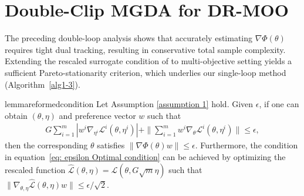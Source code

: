 \documentclass[twoside]{article} %
\def\eqref#1{equation~\ref{#1}}
\theoremstyle{plain}
\theoremstyle{definition}
\theoremstyle{remark}
\newcommand{\fL}{\mathcal{L}}
\newcommand{\fhL}{\hat{\mathcal{L}}}
\begin{document}
\section{Double-Clip MGDA for DR-MOO}\label{sec: single-loop algorithm}
The preceding double-loop analysis shows that accurately estimating \(\nabla\Phi(\theta)\) requires tight dual tracking, resulting in conservative total sample complexity. Extending the rescaled surrogate condition of \citet{jinnonconvexdro} to multi-objective setting yields a sufficient Pareto-stationarity criterion, which underlies our single-loop method (Algorithm~\ref{alg1-3}).
\begin{restatable}{lemma}{reformedcondition}\label{lemma: optimality condition}
    Let Assumption \ref{assumption 1} hold. Given $\epsilon$, if one can obtain $({\theta},{\eta})$ and preference vector $w$ such that
\begin{align}
    G\!\sum_{i=1}^{m}\!|w^i\nabla_{\eta^i} \fL^i({\theta}, \eta^i) | + \| \!\sum_{i=1}^{m} w^i \nabla_{{\theta}}\fL^i({\theta},\eta^i)  \|\leq \epsilon,
    \label{eq: epsilon Optimal condition}
\end{align}
then the corresponding ${\theta}$ satisfies
$\| \nabla\Phi({\theta})w \|\leq\epsilon$. Furthermore, the condition in \eqref{eq: epsilon Optimal condition} can be achieved by optimizing the rescaled function $\fhL(\theta,\eta) = \fL(\theta, G\sqrt{m}\eta)$ such that
$\|\nabla_{{\theta}, {\eta}} \fhL({\theta}, \eta)w \|\leq {\epsilon}/{\sqrt{2}}$.
\end{restatable} 
\end{document}
